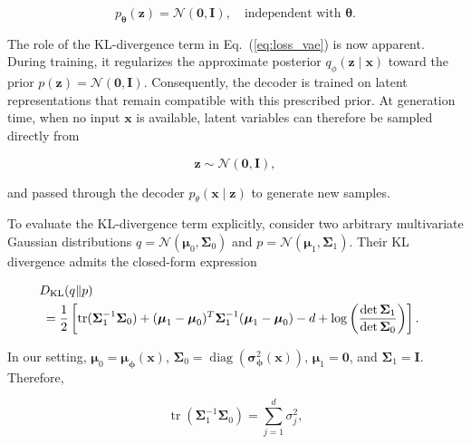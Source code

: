 \documentclass[10pt,twocolumn,article]{memoir}
\begin{document}
\begin{equation}
\label{eq:reparam_prior}
    p_{\boldsymbol{\theta}}(\mathbf{z}) = \mathcal{N}(\mathbf{0}, \mathbf{I}), \quad \text{independent with } \boldsymbol{\theta}.
\end{equation}

The role of the KL-divergence term in Eq.~(\ref{eq:loss_vae}) is now apparent.
During training, it regularizes the approximate posterior
$q_{\phi}(\mathbf{z}\mid\mathbf{x})$ toward the prior
$p(\mathbf{z})=\mathcal{N}(\mathbf{0},\mathbf{I})$.
Consequently, the decoder is trained on latent representations that remain
compatible with this prescribed prior. At generation time, when no input
$\mathbf{x}$ is available, latent variables can therefore be sampled directly
from

\begin{equation}
\mathbf{z} \sim \mathcal{N}(\mathbf{0},\mathbf{I}),
\end{equation}

and passed through the decoder $p_{\theta}(\mathbf{x}\mid\mathbf{z})$ to
generate new samples.

To evaluate the KL-divergence term explicitly, consider two arbitrary
multivariate Gaussian distributions
$q=\mathcal{N}(\boldsymbol{\mu}_0,\boldsymbol{\Sigma}_0)$ and
$p=\mathcal{N}(\boldsymbol{\mu}_1,\boldsymbol{\Sigma}_1)$. Their
KL divergence admits the closed-form expression

\begin{equation}
\label{eq:dkl_general_gaussians}
\begin{aligned}
D_{\mathrm{KL}}(q \| p)
\\
&\hspace{-4em}=
\frac{1}{2}\left[
\operatorname{tr}(\boldsymbol{\Sigma}_1^{-1}\boldsymbol{\Sigma}_0)
+
(\boldsymbol{\mu}_1-\boldsymbol{\mu}_0)^T
\boldsymbol{\Sigma}_1^{-1}
(\boldsymbol{\mu}_1-\boldsymbol{\mu}_0)
-d
+
\log\left(
\frac{\det\boldsymbol{\Sigma}_1}
     {\det\boldsymbol{\Sigma}_0}
\right)
\right].
\end{aligned}
\end{equation}

In our setting,
$\boldsymbol{\mu}_0=\boldsymbol{\mu}_{\boldsymbol{\phi}}(\mathbf{x})$,
$\boldsymbol{\Sigma}_0=
\operatorname{diag}\!\left(
\boldsymbol{\sigma}_{\boldsymbol{\phi}}^2(\mathbf{x})
\right)$,
$\boldsymbol{\mu}_1=\mathbf{0}$, and
$\boldsymbol{\Sigma}_1=\mathbf{I}$.
Therefore,

\begin{equation}
\operatorname{tr}
\left(
\boldsymbol{\Sigma}_1^{-1}\boldsymbol{\Sigma}_0
\right)
=
\sum_{j=1}^{d}\sigma_j^2,
\end{equation}
\end{document}
